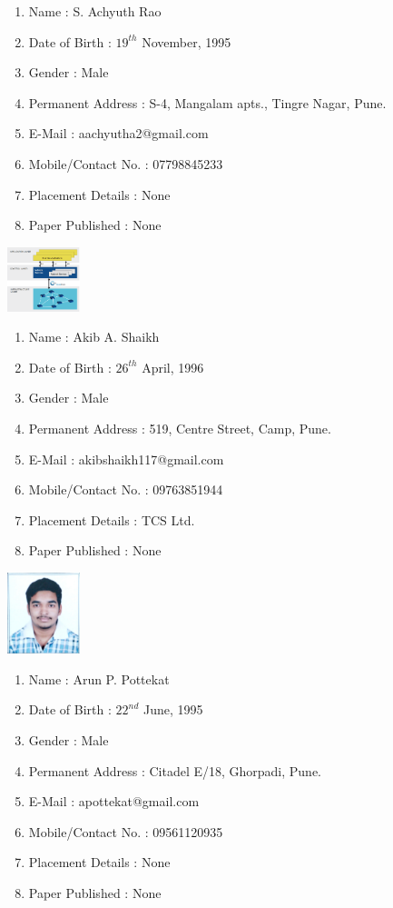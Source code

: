 \documentclass[12pt,a4paper,final]{report}
\begin{document}
{{{{{\begin{enumerate}
\item Name : S. Achyuth Rao
\item Date of Birth : $19^{th}$ November, 1995
\item Gender : Male
\item Permanent Address : S-4, Mangalam apts., Tingre Nagar, Pune.
\item E-Mail : aachyutha2@gmail.com
\item Mobile/Contact No. : 07798845233
\item Placement Details : None
\item Paper Published : None

\end{enumerate}

\newpage
\begin{flushright}
\includegraphics[width=60pt]{akib.png}
\end{flushright}

\begin{enumerate}
\item Name : Akib A. Shaikh
\item Date of Birth : $26^{th}$ April, 1996
\item Gender : Male
\item Permanent Address : 519, Centre Street, Camp, Pune.
\item E-Mail : akibshaikh117@gmail.com
\item Mobile/Contact No. : 09763851944
\item Placement Details : TCS Ltd.
\item Paper Published : None

\end{enumerate}
\newpage
\begin{flushright}
\includegraphics[width=60pt]{arun.jpg}
\end{flushright}

\begin{enumerate}
\item Name : Arun P. Pottekat
\item Date of Birth : $22^{nd}$ June, 1995
\item Gender : Male
\item Permanent Address : Citadel E/18, Ghorpadi, Pune.
\item E-Mail : apottekat@gmail.com		
\item Mobile/Contact No. : 09561120935
\item Placement Details : None
\item Paper Published : None


\end{enumerate}}}}}}
\end{document}
